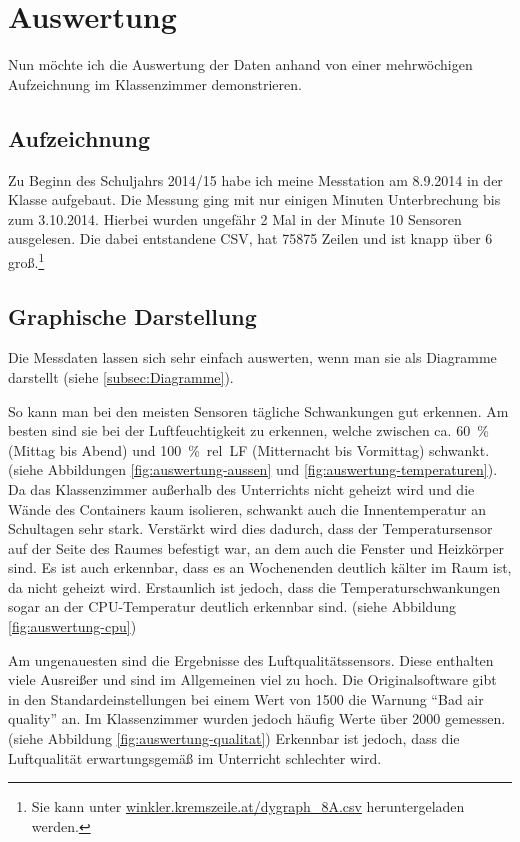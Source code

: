 \chapter{Auswertung}
\label{cha:Auswertung}

Nun möchte ich die Auswertung der Daten anhand von einer mehrwöchigen Aufzeichnung im Klassenzimmer demonstrieren.

\section{Aufzeichnung}
\label{auswertung_aufzeichnung}

Zu Beginn des Schuljahrs 2014/15 habe ich meine Messtation am 8.9.2014 in der Klasse aufgebaut. Die Messung ging mit nur einigen Minuten Unterbrechung bis zum 3.10.2014. Hierbei wurden ungefähr 2 Mal in der Minute 10 Sensoren ausgelesen. Die dabei entstandene \gls{CSV}, hat 75875 Zeilen und ist knapp über \SI{6}{\mega\byte} groß.\footnote{Sie kann unter \href{http://winkler.kremszeile.at/dygraph_8A.csv}{winkler.kremszeile.at/dygraph\_8A.csv} heruntergeladen werden.}

\section{Graphische Darstellung}

Die Messdaten lassen sich sehr einfach auswerten, wenn man sie als Diagramme darstellt (siehe \ref{subsec:Diagramme}). 

So kann man bei den meisten Sensoren tägliche Schwankungen gut erkennen. Am besten sind sie bei der Luftfeuchtigkeit zu erkennen, welche zwischen ca. \SI{60}{\%} (Mittag bis Abend) und \SI{100}{\%.rel.LF} (Mitternacht bis Vormittag) schwankt. (siehe Abbildungen \ref{fig:auswertung-aussen} und \ref{fig:auswertung-temperaturen}).
Da das Klassenzimmer außerhalb des Unterrichts nicht geheizt wird und die Wände des Containers kaum isolieren, schwankt auch die Innentemperatur an Schultagen sehr stark. Verstärkt wird dies dadurch, dass der Temperatursensor auf der Seite des Raumes befestigt war, an dem auch die Fenster und Heizkörper sind. Es ist auch erkennbar, dass es an Wochenenden deutlich kälter im Raum ist, da nicht geheizt wird. 
Erstaunlich ist jedoch, dass die Temperaturschwankungen sogar an der \gls{CPU}-Temperatur deutlich erkennbar sind. (siehe Abbildung \ref{fig:auswertung-cpu})

Am ungenauesten sind die Ergebnisse des Luftqualitätssensors. Diese enthalten viele Ausreißer und sind im Allgemeinen viel zu hoch. Die Originalsoftware gibt in den Standardeinstellungen bei einem Wert von 1500 die Warnung \enquote{Bad air quality} an. Im Klassenzimmer wurden jedoch häufig Werte über 2000 gemessen. (siehe Abbildung \ref{fig:auswertung-qualitat}) Erkennbar ist jedoch, dass die Luftqualität erwartungsgemäß im Unterricht schlechter wird. 

